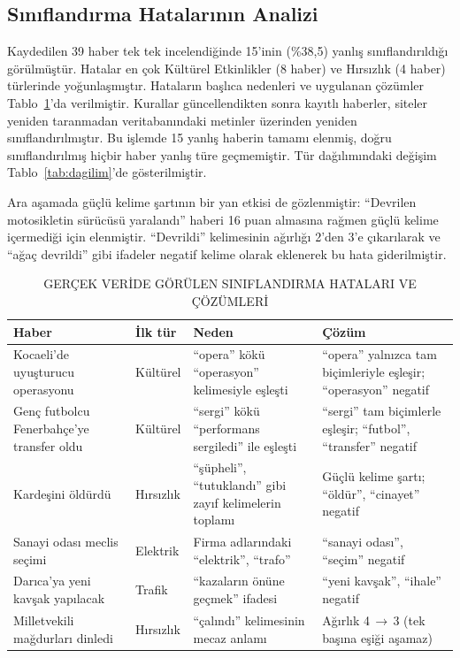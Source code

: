 \documentclass[conference,a4paper]{IEEEtran}
\begin{document}
\subsection{Sınıflandırma Hatalarının Analizi}
Kaydedilen 39 haber tek tek incelendiğinde 15'inin (\%38,5) yanlış
sınıflandırıldığı görülmüştür. Hatalar en çok Kültürel Etkinlikler (8 haber) ve
Hırsızlık (4 haber) türlerinde yoğunlaşmıştır. Hataların başlıca nedenleri ve
uygulanan çözümler Tablo~\ref{tab:hata}'da verilmiştir. Kurallar güncellendikten
sonra kayıtlı haberler, siteler yeniden taranmadan veritabanındaki metinler
üzerinden yeniden sınıflandırılmıştır. Bu işlemde 15 yanlış haberin tamamı
elenmiş, doğru sınıflandırılmış hiçbir haber yanlış türe geçmemiştir. Tür
dağılımındaki değişim Tablo~\ref{tab:dagilim}'de gösterilmiştir.

Ara aşamada güçlü kelime şartının bir yan etkisi de gözlenmiştir: ``Devrilen
motosikletin sürücüsü yaralandı'' haberi 16 puan almasına rağmen güçlü kelime
içermediği için elenmiştir. ``Devrildi'' kelimesinin ağırlığı 2'den 3'e
çıkarılarak ve ``ağaç devrildi'' gibi ifadeler negatif kelime olarak eklenerek
bu hata giderilmiştir.

\begin{table}[!t]
\caption{GERÇEK VERİDE GÖRÜLEN SINIFLANDIRMA HATALARI VE ÇÖZÜMLERİ}
\label{tab:hata}
\centering\footnotesize
\begin{tabular}{@{}>{\raggedright\arraybackslash}p{}>{\raggedright\arraybackslash}p{}>{\raggedright\arraybackslash}p{}>{\raggedright\arraybackslash}p{}@{}}
\toprule
\textbf{Haber} & \textbf{İlk tür} & \textbf{Neden} & \textbf{Çözüm} \\
\midrule
Kocaeli'de uyuşturucu operasyonu & Kültürel & ``opera'' kökü ``operasyon'' kelimesiyle eşleşti &
``opera'' yalnızca tam biçimleriyle eşleşir; ``operasyon'' negatif \\
Genç futbolcu Fenerbahçe'ye transfer oldu & Kültürel & ``sergi'' kökü ``performans sergiledi'' ile eşleşti &
``sergi'' tam biçimlerle eşleşir; ``futbol'', ``transfer'' negatif \\
Kardeşini öldürdü & Hırsızlık & ``şüpheli'', ``tutuklandı'' gibi zayıf kelimelerin toplamı &
Güçlü kelime şartı; ``öldür'', ``cinayet'' negatif \\
Sanayi odası meclis seçimi & Elektrik & Firma adlarındaki ``elektrik'', ``trafo'' &
``sanayi odası'', ``seçim'' negatif \\
Darıca'ya yeni kavşak yapılacak & Trafik & ``kazaların önüne geçmek'' ifadesi &
``yeni kavşak'', ``ihale'' negatif \\
Milletvekili mağdurları dinledi & Hırsızlık & ``çalındı'' kelimesinin mecaz anlamı &
Ağırlık 4\,$\rightarrow$\,3 (tek başına eşiği aşamaz) \\
\bottomrule
\end{tabular}
\end{table}
\end{document}
